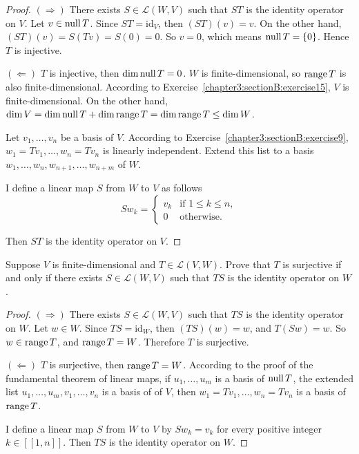 \begin{proof}
    $(\Rightarrow)$ There exists $S\in\mathcal{L}(W, V)$ such that $ST$ is the identity operator on $V$. Let $v\in\text{null}\,{T}$. Since $ST = \text{id}_{V}$, then $(ST)(v) = v$. On the other hand, $(ST)(v) = S(Tv) = S(0) = 0$. So $v = 0$, which means $\text{null}\,{T} = \{0\}$. Hence $T$ is injective.

    $(\Leftarrow)$ $T$ is injective, then $\dim\text{null}\,{T} = 0$. $W$ is finite-dimensional, so $\text{range}\,{T}$ is also finite-dimensional. According to Exercise~\ref{chapter3:sectionB:exercise15}, $V$ is finite-dimensional. On the other hand, $\dim V = \dim\text{null}\,{T} + \dim\text{range}\,{T} = \dim\text{range}\,{T}\leq \dim W$.

    Let $v_{1}, \ldots, v_{n}$ be a basis of $V$. According to Exercise~\ref{chapter3:sectionB:exercise9}, $w_{1} = Tv_{1}, \ldots, w_{n} = Tv_{n}$ is linearly independent. Extend this list to a basis $w_{1}, \ldots, w_{n}, w_{n+1}, \ldots, w_{n+m}$ of $W$.

    I define a linear map $S$ from $W$ to $V$ as follows
    \[
        Sw_{k} = \begin{cases}
            v_{k} & \text{if $1\leq k\leq n$}, \\
            0     & \text{otherwise}.
        \end{cases}
    \]

    Then $ST$ is the identity operator on $V$.
\end{proof}
\newpage

\begin{exercise}
    Suppose $V$ is finite-dimensional and $T\in\mathcal{L}(V, W)$. Prove that $T$ is surjective if and only if there exists $S\in\mathcal{L}(W, V)$ such that $TS$ is the identity operator on $W$.
\end{exercise}

\begin{proof}
    $(\Rightarrow)$ There exists $S\in\mathcal{L}(W, V)$ such that $TS$ is the identity operator on $W$. Let $w\in W$. Since $TS = \text{id}_{W}$, then $(TS)(w) = w$, and $T(Sw) = w$. So $w\in \text{range}\,{T}$, and $\text{range}\,{T} = W$. Therefore $T$ is surjective.

    $(\Leftarrow)$ $T$ is surjective, then $\text{range}\,{T} = W$. According to the proof of the fundamental theorem of linear maps, if $u_{1}, \ldots, u_{m}$ is a basis of $\text{null}\,{T}$, the extended list $u_{1}, \ldots, u_{m}, v_{1}, \ldots, v_{n}$ is a basis of of $V$, then $w_{1} = Tv_{1}, \ldots, w_{n} = Tv_{n}$ is a basis of $\text{range}\,{T}$.

    I define a linear map $S$ from $W$ to $V$ by $Sw_{k} = v_{k}$ for every positive integer $k\in[\![ 1, n ]\!]$. Then $TS$ is the identity operator on $W$.
\end{proof}
\newpage

